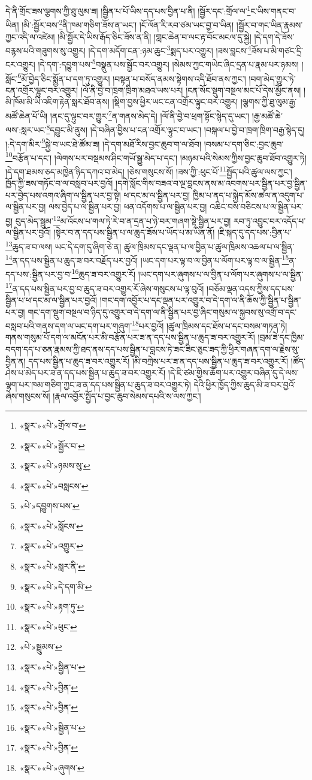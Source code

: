དེ་ནི་གྲོང་ཟས་ལྕགས་ཀྱི་ཐུ་ལུམ་ཟ། །སྦྱིན་པ་པོ་ཡིས་དད་པས་བྱིན་པ་ནི། །སྦྱོར་དང་:གྲོལ་ལ་\footnote{«སྣར་»«པེ་»གྲོལ་བ་}ང་ཡིས་གནང་བ་ཡིན། །མི་:སྦྱོར་བས་\footnote{«སྣར་»«པེ་»སྦྱོར་བ་}ནི་ཁམ་གཅིག་ཟོས་ན་ཡང་། །ངོ་ལོན་རི་རབ་ཙམ་ཡང་བྱ་བ་ཡིན། །སྦྱོར་བ་གང་ཡིན་རྣམས་ཀྱང་འདི་ལ་འཛེམ། །མི་སྦྱོར་དེ་ཡིས་རྒོད་ཅིང་ཟོས་ན་ནི། །གླང་ཆེན་བ་ལང་རྟ་བོང་མངལ་དུ་སྐྱེ། །དེ་དག་དེ་ཟོས་བརྙས་པའི་གཟུགས་སུ་འགྱུར། །དེ་དག་མདོག་ངན་:ཉམ་ཆུང་\footnote{«སྣར་»«པེ་»ཉམས་སུ་}སྨད་པར་འགྱུར། །ཟས་བླངས་\footnote{«སྣར་»«པེ་»བསླངས་}ཟོས་པ་མི་གཙང་དྲི་ངར་འགྱུར། །དེ་དག་:དབྱུག་པས་\footnote{«པེ་»དབྱུགས་པས་}བསྣུན་པས་སྦྱོང་བར་འགྱུར། །སེམས་ཀྱང་གཡེང་ཞིང་དྲན་པ་རྣམ་པར་ཉམས། །སློང་\footnote{«སྣར་»«པེ་»སློངས་}མོ་བྱེད་ཅིང་སྨྱོན་པ་དག་ཏུ་འགྱུར། །བསྟན་པ་བསོད་ནམས་སྟེགས་འདི་ཐོབ་ནས་ཀྱང་། །བག་མེད་གྱུར་ཏེ་ངན་འགྲོར་ལྷུང་བར་འགྱུར། །ལོ་ནི་བྱེ་བ་ཁྲག་ཁྲིག་མཐའ་ཡས་པར། །ངན་སོང་སྡུག་བསྔལ་མང་པོ་དེས་མྱོང་ནས། །མི་ཁོམ་མི་ཡི་འཇིག་རྟེན་སླར་ཐོབ་ནས། །སྡིག་བྱས་ཕྱིར་ཡང་ངན་འགྲོར་ལྟུང་བར་འགྱུར། །ལྕགས་ཀྱི་ཐུ་ལུམ་རྒྱ་མཚོ་ཆེན་པོ་ཡི། །ནང་དུ་ལྟུང་བར་གྱུར་\footnote{«སྣར་»«པེ་»འགྱུར་}ན་གནས་མེད་དེ། །ལོ་ནི་བྱེ་བ་ཕྲག་སྟོང་སྙེད་དུ་ཡང་། །རྒྱ་མཚོ་ཆེ་ལས་:སླར་ཡང་\footnote{«སྣར་»«པེ་»སླར་ནི་}དབྱུང་མི་ནུས། །དེ་བཞིན་བྱིས་པ་ངན་འགྲོར་ལྟུང་བ་ཡང་། །བསྐལ་པ་བྱེ་བ་ཁྲག་ཁྲིག་བརྒྱ་སྙེད་དུ། །:དེ་དག་མིར་\footnote{«སྣར་»«པེ་»དེ་དག་མི་}སྐྱེ་བ་ཡང་ཐེ་ཚོམ་ཟ། །དེ་དག་མཐོ་རིས་བྱང་ཆུབ་ག་ལ་ཐོབ། །བསམ་པ་དག་ཅིང་:བྱང་ཆུབ་\footnote{«སྣར་»«པེ་»རྟག་ཏུ་}བརྩོན་པ་དང་། །ལེགས་པར་བསྡམས་ཤིང་གཡོ་སྒྱུ་མེད་པ་དང་། །མཉམ་པའི་སེམས་ཀྱིས་བྱང་ཆུབ་ཐོབ་འགྱུར་ཏེ། །དེ་དག་ཐམས་ཅད་མཁྱེན་ཉིད་དཀའ་བ་མེད། །ཅེས་གསུངས་སོ། །ཟས་ཀྱི་:ཕུང་པོ་\footnote{«སྣར་»«པེ་»ཕུང་}སྤྱོད་པའི་ཚུལ་ལས་ཀྱང་། ཁྱོད་ཀྱི་ཟས་གཏོང་བ་ལ་བསླབ་པར་བྱའོ། །དགེ་སློང་གིས་བཟའ་བ་ལྔ་བླངས་ནས་མ་འབགས་པར་སྦྱིན་པར་བྱ་སྦྱིན་པར་བྱེད་པས་འགའ་ཞིག་ལ་སྦྱིན་པར་བྱ་སྟེ། ཕ་དང་མ་ལ་སྦྱིན་པར་བྱ། ཁྱིམ་པ་ནད་པ་སྐྱེད་མོས་ཚལ་ན་འདུག་པ་ལ་སྦྱིན་པར་བྱ། ལས་བྱེད་པ་ལ་སྦྱིན་པར་བྱ། ཕན་འདོགས་པ་ལ་སྦྱིན་པར་བྱ། འཆིང་བས་བཅིངས་པ་ལ་སྦྱིན་པར་བྱ། བུད་མེད་སྦྲུམ་\footnote{«པེ་»སྦྲུམས་}མ་འོངས་པ་གལ་ཏེ་རེ་བ་ན་དྲན་པ་ཉེ་བར་གཞག་སྟེ་སྦྱིན་པར་བྱ། རབ་ཏུ་འབྱུང་བར་འདོད་པ་ལ་སྦྱིན་པར་བྱའོ། །སྟེར་བ་ན་དད་པས་སྦྱིན་པ་ལ་ཆུད་ཟོས་པ་ཡོད་པ་མ་ཡིན་ནོ། །ཇི་སྐད་དུ་དད་པས་:བྱིན་པ་\footnote{«སྣར་»«པེ་»སྦྱིན་པ་}ཆུད་ཟ་བ་ལས། ཡང་དེ་དག་དུ་ཞིག་ཅེ་ན། ཚུལ་ཁྲིམས་དང་ལྡན་པ་ལ་བྱིན་པ་ཚུལ་ཁྲིམས་འཆལ་པ་ལ་སྦྱིན་\footnote{«སྣར་»«པེ་»བྱིན་}ན་དད་པས་སྦྱིན་པ་ཆུད་ཟ་བར་བརྗོད་པར་བྱའོ། །ཡང་དག་པར་ལྟ་བ་ལ་བྱིན་པ་ལོག་པར་ལྟ་བ་ལ་སྦྱིན་\footnote{«སྣར་»«པེ་»བྱིན་}ན་དད་པས་:སྦྱིན་པར་བྱ་བ་\footnote{«སྣར་»«པེ་»སྦྱིན་པ་}ཆུད་ཟ་བར་འགྱུར་རོ། །ཡང་དག་པར་ཞུགས་པ་ལ་བྱིན་པ་ལོག་པར་ཞུགས་པ་ལ་སྦྱིན་\footnote{«སྣར་»«པེ་»བྱིན་}ན་དད་པས་སྦྱིན་པར་བྱ་བ་ཆུད་ཟ་བར་འགྱུར་རོ་ཞེས་གསུངས་པ་ལྟ་བུའོ། །བཅོམ་ལྡན་འདས་ཀྱིས་དད་པས་སྦྱིན་པ་ཕ་དང་མ་ལ་སྦྱིན་པར་བྱའོ། །གང་དག་འབྱོར་པ་དང་ལྡན་པར་འགྱུར་བ་དེ་དག་ལ་ནི་ཆོས་ཀྱི་སྦྱིན་པ་སྦྱིན་པར་བྱ། གང་དག་སྡུག་བསྔལ་བ་ཉིད་དུ་འགྱུར་བ་དེ་དག་ལ་ནི་སྦྱིན་པར་བྱ་ཞིང་གསུམ་ལ་སྐྱབས་སུ་འགྲོ་བ་དང་བསླབ་པའི་གནས་དག་ལ་ཡང་དག་པར་གཞུག་\footnote{«སྣར་»«པེ་»ཞུགས་}པར་བྱའོ། །ཚུལ་ཁྲིམས་དང་ཐོས་པ་དང་བསམ་གཏན་ཏེ། གནས་གསུམ་པོ་དག་ལ་མངོན་པར་མི་བརྩོན་པར་ཟ་ན་དད་པས་སྦྱིན་པ་ཆུད་ཟ་བར་འགྱུར་རོ། །བྲམ་ཟེ་དང་ཁྱིམ་བདག་དད་པ་ཅན་རྣམས་ཀྱི་ཐད་ནས་དད་པས་སྦྱིན་པ་བླངས་ཏེ་ཟང་ཟིང་ཅུང་ཟད་ཀྱི་ཕྱིར་གཞན་དག་ལ་རྗེས་སུ་བྱིན་ན། དད་པས་སྦྱིན་པ་ཆུད་ཟ་བར་འགྱུར་རོ། །མི་བཀྲེས་པར་ཟ་ན་དད་པས་སྦྱིན་པ་ཆུད་ཟ་བར་འགྱུར་རོ། །ཚོད་ཤེས་པ་མེད་པར་ཟ་ན་དད་པས་སྦྱིན་པ་ཆུད་ཟ་བར་འགྱུར་རོ། །དེ་ཇི་ཙམ་གྱིས་ཆོག་པར་འགྱུར་བཞིན་དུ་དེ་ལས་ལྷག་པར་ཁམ་གཅིག་ཀྱང་ཟ་ན་དད་པས་སྦྱིན་པ་ཆུད་ཟ་བར་འགྱུར་ཏེ། དེའི་ཕྱིར་ཁྱོད་ཀྱིས་ཆུད་མི་ཟ་བར་བྱའོ་ཞེས་གསུངས་སོ། །རྣལ་འབྱོར་སྤྱོད་པ་བྱང་ཆུབ་སེམས་དཔའི་ས་ལས་ཀྱང་། 